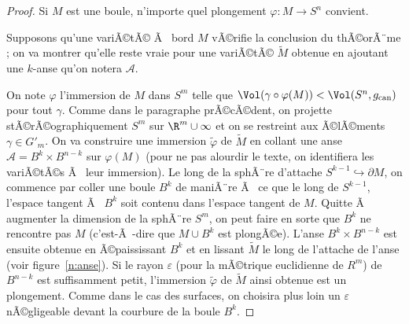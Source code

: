 \documentclass[11pt,a4paper]{smfart}
\begin{document}
\begin{proof}
Si $M$ est une boule, n'importe quel plongement  $\varphi:M\to S^n$
convient.

Supposons qu'une variÃ©tÃ© Ã  bord $M$ vÃ©rifie la conclusion du thÃ©orÃ¨me ;
on va montrer qu'elle reste vraie pour une variÃ©tÃ© $\tilde M$ obtenue
en ajoutant une $k$-anse qu'on notera $\mathcal A$.

On note $\varphi$ l'immersion de $M$ dans $S^m$ telle que
$\Vol(\gamma\circ\varphi(M))<\Vol(S^n,g_{\textrm{can}})$ pour tout $\gamma$.
Comme dans le paragraphe prÃ©cÃ©dent, on projette stÃ©rÃ©ographiquement
$S^m$ sur $\R^m\cup\infty$ et on se restreint aux Ã©lÃ©ments $\gamma\in G'_m$.
On va construire une immersion $\tilde\varphi$ de $\tilde M$ en collant une
anse
$\mathcal A=B^k\times B^{n-k}$ sur $\varphi(M)$ (pour ne pas alourdir
le texte, on identifiera les variÃ©tÃ©s Ã  leur immersion).
Le long de la sphÃ¨re d'attache $S^{k-1} \hookrightarrow\partial M$, on
commence par coller une boule $B^k$ de maniÃ¨re Ã  ce que le long de
$S^{k-1}$, l'espace tangent Ã  $B^k$ soit contenu dans l'espace tangent de
$M$. Quitte Ã  augmenter la dimension de la sphÃ¨re $S^m$,
on peut faire en sorte que $B^k$ ne rencontre pas $M$ (c'est-Ã -dire
que $M\cup B^k$ est plongÃ©e). L'anse $B^k\times B^{n-k}$ est ensuite
obtenue en Ã©paississant $B^k$ et en lissant $\tilde M$ le long de l'attache
de l'anse (voir figure~\ref{n:anse}). Si le rayon $\varepsilon$
(pour la mÃ©trique
euclidienne de $R^m$) de $B^{n-k}$ est suffisamment petit, l'immersion
$\tilde\varphi$ de $\tilde M$ ainsi obtenue est un plongement.
Comme dans le cas des surfaces, on choisira plus loin un $\varepsilon$
nÃ©gligeable devant la courbure de la boule $B^k$.


\end{proof}
\end{document}
